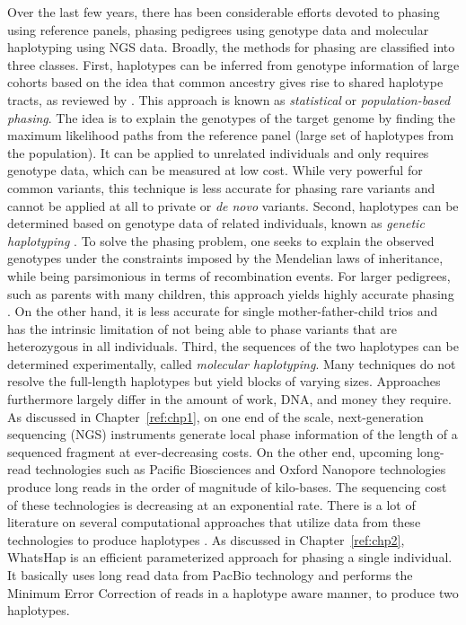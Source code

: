 Over the last few years, there has been considerable efforts devoted to phasing using reference panels, phasing pedigrees using genotype data and molecular haplotyping using NGS data.
Broadly, the methods for phasing are classified into three classes. 
First, haplotypes can be inferred from genotype information of large cohorts based on the idea that common ancestry gives rise to shared haplotype tracts, as reviewed by \cite{Browning2011, loh2016fast, loh2016reference}.
This approach is known as \emph{statistical} or \emph{population-based phasing}.
The idea is to explain the genotypes of the target genome by finding the maximum likelihood paths from the reference panel (large set of haplotypes from the population).
It can be applied to unrelated individuals and only requires genotype data, which can be measured at low cost.
While very powerful for common variants, this technique is less accurate for phasing rare variants and cannot be applied at all to private or \textit{de novo} variants.
%
Second, haplotypes can be determined based on genotype data of related individuals, known as \emph{genetic haplotyping} \citep{Glusman2014}.
To solve the phasing problem, one seeks to explain the observed genotypes under the constraints imposed by the Mendelian laws of inheritance, while being parsimonious in terms of recombination events.
For larger pedigrees, such as parents with many children, this approach yields highly accurate phasing \citep{Roach2011, abecasis2002merlin, williams2010rapid}.
On the other hand, it is less accurate for single mother-father-child trios and has the intrinsic limitation of not being able to phase variants that are heterozygous in all individuals.
%
Third, the sequences of the two haplotypes can be determined experimentally, called \emph{molecular haplotyping}.
Many techniques do not resolve the full-length haplotypes but yield blocks of varying sizes.
Approaches furthermore largely differ in the amount of work, DNA, and money they require.
As discussed in Chapter~\ref{ref:chp1}, on one end of the scale, next-generation sequencing (NGS) instruments generate local phase information of the length of a sequenced fragment at ever-decreasing costs.
On the other end, upcoming long-read technologies such as Pacific Biosciences and Oxford Nanopore technologies produce long reads in the order of magnitude of kilo-bases.
The sequencing cost of these technologies is decreasing at an exponential rate.
There is a lot of literature on several computational approaches that utilize data from these technologies to produce haplotypes \citep{rhee2016survey}.
As discussed in Chapter~\ref{ref:chp2}, WhatsHap is an efficient parameterized approach for phasing a single individual.
It basically uses long read data from PacBio technology and performs the Minimum Error Correction of reads in a haplotype aware manner, to produce two haplotypes.

